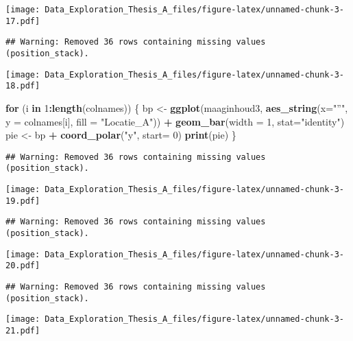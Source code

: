 \documentclass[]{article}
\newenvironment{Shaded}{\begin{snugshade}}{\end{snugshade}}
\newcommand{\KeywordTok}[1]{\textcolor[rgb]{0.13,0.29,0.53}{\textbf{#1}}}
\newcommand{\DataTypeTok}[1]{\textcolor[rgb]{0.13,0.29,0.53}{#1}}
\newcommand{\DecValTok}[1]{\textcolor[rgb]{0.00,0.00,0.81}{#1}}
\newcommand{\StringTok}[1]{\textcolor[rgb]{0.31,0.60,0.02}{#1}}
\newcommand{\ControlFlowTok}[1]{\textcolor[rgb]{0.13,0.29,0.53}{\textbf{#1}}}
\newcommand{\OperatorTok}[1]{\textcolor[rgb]{0.81,0.36,0.00}{\textbf{#1}}}
\newcommand{\NormalTok}[1]{#1}
\begin{document}
\texttt{[image: Data\_Exploration\_Thesis\_A\_files/figure-latex/unnamed-chunk-3-17.pdf]}

\begin{verbatim}
## Warning: Removed 36 rows containing missing values (position_stack).
\end{verbatim}

\texttt{[image: Data\_Exploration\_Thesis\_A\_files/figure-latex/unnamed-chunk-3-18.pdf]}

\begin{Shaded}
\begin{Highlighting}[]
\ControlFlowTok{for}\NormalTok{ (i }\ControlFlowTok{in} \DecValTok{1}\OperatorTok{:}\KeywordTok{length}\NormalTok{(colnames)) \{}
\NormalTok{  bp <-}\StringTok{ }\KeywordTok{ggplot}\NormalTok{(maaginhoud3, }\KeywordTok{aes_string}\NormalTok{(}\DataTypeTok{x=}\StringTok{"''"}\NormalTok{, }\DataTypeTok{y =}\NormalTok{ colnames[i], }\DataTypeTok{fill =} \StringTok{"Locatie_A"}\NormalTok{)) }\OperatorTok{+}
\StringTok{    }\KeywordTok{geom_bar}\NormalTok{(}\DataTypeTok{width =} \DecValTok{1}\NormalTok{, }\DataTypeTok{stat=}\StringTok{"identity"}\NormalTok{)}
\NormalTok{  pie <-}\StringTok{ }\NormalTok{bp }\OperatorTok{+}\StringTok{ }\KeywordTok{coord_polar}\NormalTok{(}\StringTok{"y"}\NormalTok{, }\DataTypeTok{start=} \DecValTok{0}\NormalTok{)}
  \KeywordTok{print}\NormalTok{(pie)}
\NormalTok{\}}
\end{Highlighting}
\end{Shaded}

\begin{verbatim}
## Warning: Removed 36 rows containing missing values (position_stack).
\end{verbatim}

\texttt{[image: Data\_Exploration\_Thesis\_A\_files/figure-latex/unnamed-chunk-3-19.pdf]}

\begin{verbatim}
## Warning: Removed 36 rows containing missing values (position_stack).
\end{verbatim}

\texttt{[image: Data\_Exploration\_Thesis\_A\_files/figure-latex/unnamed-chunk-3-20.pdf]}

\begin{verbatim}
## Warning: Removed 36 rows containing missing values (position_stack).
\end{verbatim}

\texttt{[image: Data\_Exploration\_Thesis\_A\_files/figure-latex/unnamed-chunk-3-21.pdf]}
\end{document}
